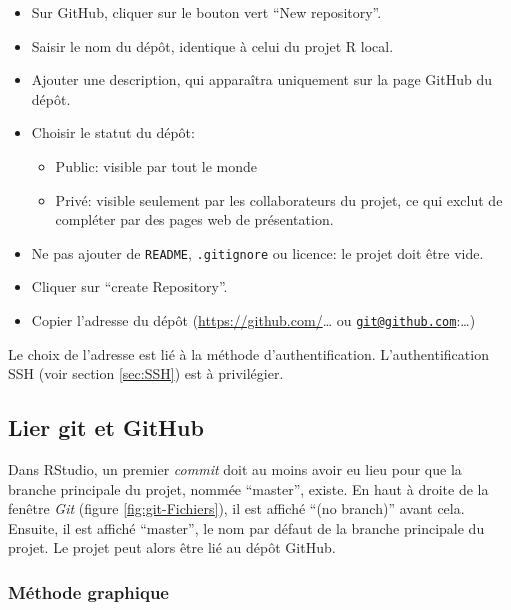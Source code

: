 \documentclass[
  12pt,
  french,
  a4paper,
  extrafontsizes,onecolumn,openright
  ]{memoir}
\providecommand{\tightlist}{%
  \setlength{\itemsep}{0pt}\setlength{\parskip}{0pt}}
\begin{document}
\begin{itemize}
\tightlist
\item
  Sur GitHub, cliquer sur le bouton vert \enquote{New repository}.
\item
  Saisir le nom du dépôt, identique à celui du projet R local.
\item
  Ajouter une description, qui apparaîtra uniquement sur la page GitHub du dépôt.
\item
  Choisir le statut du dépôt:

  \begin{itemize}
  \tightlist
  \item
    Public: visible par tout le monde
  \item
    Privé: visible seulement par les collaborateurs du projet, ce qui exclut de compléter par des pages web de présentation.
  \end{itemize}
\item
  Ne pas ajouter de \texttt{README}, \texttt{.gitignore} ou licence: le projet doit être vide.
\item
  Cliquer sur \enquote{create Repository}.
\item
  Copier l'adresse du dépôt (\url{https://github.com/}\ldots{} ou \href{mailto:git@github.com}{\nolinkurl{git@github.com}}:\ldots)
\end{itemize}

Le choix de l'adresse est lié à la méthode d'authentification.
L'authentification SSH (voir section \ref{sec:SSH}) est à privilégier.

\hypertarget{lier-git-et-github}{%
\subsection{Lier git et GitHub}\label{lier-git-et-github}}

Dans RStudio, un premier \emph{commit} doit au moins avoir eu lieu pour que la branche principale du projet, nommée \enquote{master}, existe.
En haut à droite de la fenêtre \emph{Git} (figure \ref{fig:git-Fichiers}), il est affiché \enquote{(no branch)} avant cela.
Ensuite, il est affiché \enquote{master}, le nom par défaut de la branche principale du projet.
Le projet peut alors être lié au dépôt GitHub.

\hypertarget{muxe9thode-graphique}{%
\subsubsection{Méthode graphique}\label{muxe9thode-graphique}}
\end{document}
